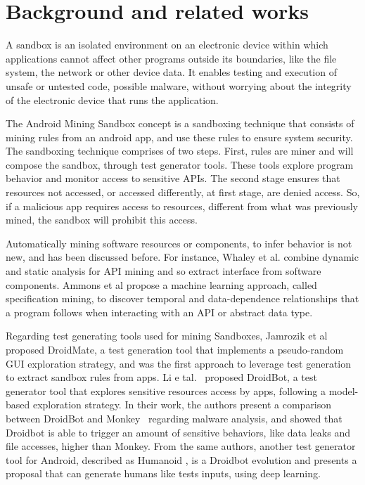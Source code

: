 \section{Background and related works}

A sandbox is an isolated environment on an electronic device within which applications cannot affect other programs outside its boundaries, like the file system, the network or other device data. It enables testing and execution of unsafe or untested code, possible malware, without worrying about the integrity of the electronic device that runs the application. 


The Android Mining Sandbox concept is a sandboxing technique that consists of mining rules from an android app, and use these rules to ensure system security. The sandboxing technique comprises of two steps. First, rules are miner and will compose the sandbox,
through test generator tools. These tools explore program behavior and monitor access to sensitive APIs. The second stage ensures that resources not accessed, or accessed differently, at first stage, are denied access. So, if a malicious app requires access to resources, different from what was previously mined, the sandbox will prohibit this access.

Automatically mining software resources or components, to infer behavior is not new, and has been discussed before. For instance, Whaley et al. \cite{DBLP:conf/issta/WhaleyML02} combine dynamic and static analysis for API mining and so extract interface from software components. Ammons et al \cite{DBLP:conf/popl/AmmonsBL02} propose a machine learning
approach, called specification mining, to discover temporal and data-dependence relationships that a program follows when interacting with an API or abstract data type.

Regarding test generating tools used for mining Sandboxes, Jamrozik et al \cite{DBLP:conf/icse/JamrozikZ16} proposed DroidMate, a test generation tool that implements a pseudo-random GUI exploration strategy, and was the first approach to leverage test generation to extract sandbox rules from apps. Li e tal.~\cite{DBLP:conf/icse/LiYGC17} proposed DroidBot, a test generator tool that explores sensitive resources access by apps, following a model-based exploration strategy. In their work, the authors present a comparison between DroidBot and Monkey~\cite{Monkey} regarding malware analysis, and showed that Droidbot is able to trigger an amount of sensitive behaviors, like data leaks and file accesses, higher than Monkey. From the same authors, another test generator tool for Android, described as Humanoid \cite{DBLP:conf/kbse/LiY0C19}, is a Droidbot evolution and presents a proposal that can generate humans like tests inputs, using deep learning.

